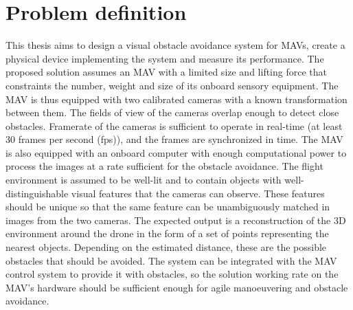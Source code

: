 \section{Problem definition}
\label{sec:problem_definition}
This thesis aims to design a visual obstacle avoidance system for MAVs, create a physical device implementing the system and measure its performance. 
The proposed solution assumes an MAV with a limited size and lifting force that constraints the number, weight and size of its onboard sensory equipment. 
The MAV is thus equipped with two calibrated cameras with a known transformation between them. 
The fields of view of the cameras overlap enough to detect close obstacles.
Framerate of the cameras is sufficient to operate in real-time (at least 30 frames per second (fps)), and the frames are synchronized in time.
The MAV is also equipped with an onboard computer with enough computational power to process the images at a rate sufficient for the obstacle avoidance.
The flight environment is assumed to be well-lit and to contain objects with well-distinguishable visual features that the cameras can observe.
These features should be unique so that the same feature can be unambiguously matched in images from the two cameras.
The expected output is a reconstruction of the 3D environment around the drone in the form of a set of points representing the nearest objects.
Depending on the estimated distance, these are the possible obstacles that should be avoided.
The system can be integrated with the MAV control system to provide it with obstacles, so the solution working rate on the MAV's hardware should be sufficient enough for agile manoeuvering and obstacle avoidance.

